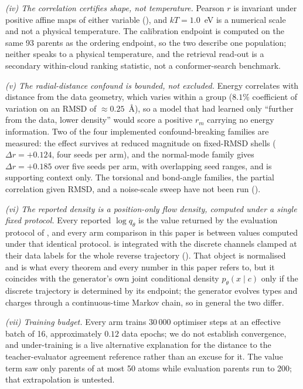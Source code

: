 \emph{(iv) The correlation certifies shape, not temperature.} Pearson $r$ is
invariant under positive affine maps of either variable (), and
$kT = 1.0$~eV is a numerical scale and not a physical temperature. The calibration
endpoint is computed on the same 93 parents as the ordering endpoint, so the two
describe one population; neither speaks to a physical temperature, and the retrieval
read-out is a secondary within-cloud ranking statistic, not a conformer-search
benchmark.

\emph{(v) The radial-distance confound is bounded, not excluded.} Energy correlates
with distance from the data geometry, which varies within a group ($8.1\%$
coefficient of variation on an RMSD of $\approx 0.25$~\AA{}), so a model that had
learned only ``further from the data, lower density'' would score a positive $r_m$
carrying no energy information. Two of the four implemented confound-breaking
families are measured: the effect survives at reduced magnitude on fixed-RMSD shells
($\Delta r = +0.124$, four seeds per arm), and the normal-mode family gives
$\Delta r = +0.185$ over five seeds per arm, with overlapping seed ranges, and is
supporting context only. The
torsional and bond-angle families, the partial correlation given RMSD, and a
noise-scale sweep have not been run ().

\emph{(vi) The reported density is a position-only flow density, computed under a
single fixed protocol.} Every reported $\log q_\theta$ is the value returned by the
evaluation protocol of , and every arm comparison in this paper is
between values computed under that identical protocol. 
is integrated with the discrete channels clamped at their data labels for the whole
reverse trajectory (). That object is normalised and is what every
theorem and every number in this paper refers to, but it coincides with the
generator's own joint conditional density $p_\theta(x \mid c)$ only if the discrete
trajectory is determined by its endpoint; the generator evolves types and charges
through a continuous-time Markov chain, so in general the two differ.

\emph{(vii) Training budget.} Every arm trains $30\,000$ optimiser steps at an
effective batch of 16, approximately $0.12$ data epochs; we do not establish
convergence, and under-training is a live alternative explanation for the distance to
the teacher-evaluator agreement reference rather than an excuse for it. The value term saw only
parents of at most 50 atoms while evaluation parents run to 200; that extrapolation is
untested.

